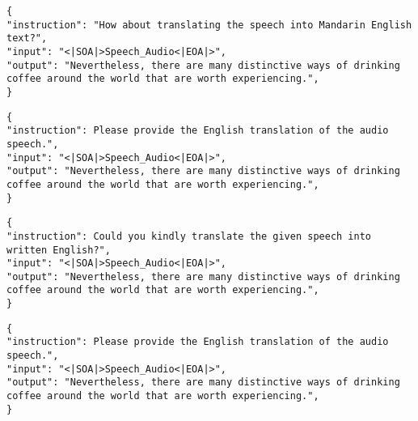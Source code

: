 \begin{tcolorbox}[colback=white, colframe=black, boxrule=0.2mm, arc=0mm, title=Speech-to-Text Translation Insutrction Variation Example 2]
\begin{lstlisting}[basicstyle=\ttfamily, breaklines=true]
{
"instruction": "How about translating the speech into Mandarin English text?", 
"input": "<|SOA|>Speech_Audio<|EOA|>", 
"output": "Nevertheless, there are many distinctive ways of drinking coffee around the world that are worth experiencing.", 
}
\end{lstlisting}
\end{tcolorbox}


\begin{tcolorbox}[colback=white, colframe=black, boxrule=0.2mm, arc=0mm, title=Speech-to-Text Translation Insutrction Variation Example 3]
\begin{lstlisting}[basicstyle=\ttfamily, breaklines=true]
{
"instruction": Please provide the English translation of the audio speech.", 
"input": "<|SOA|>Speech_Audio<|EOA|>", 
"output": "Nevertheless, there are many distinctive ways of drinking coffee around the world that are worth experiencing.", 
}
\end{lstlisting}
\end{tcolorbox}

\begin{tcolorbox}[colback=white, colframe=black, boxrule=0.2mm, arc=0mm, title=Speech-to-Text Translation Insutrction Variation Example 4]
\begin{lstlisting}[basicstyle=\ttfamily, breaklines=true]
{
"instruction": Could you kindly translate the given speech into written English?", 
"input": "<|SOA|>Speech_Audio<|EOA|>", 
"output": "Nevertheless, there are many distinctive ways of drinking coffee around the world that are worth experiencing.", 
}
\end{lstlisting}
\end{tcolorbox}



\begin{tcolorbox}[colback=white, colframe=black, boxrule=0.2mm, arc=0mm, title=Speech-to-Text Translation Insutrction Variation Example 5]
\begin{lstlisting}[basicstyle=\ttfamily, breaklines=true]
{
"instruction": Please provide the English translation of the audio speech.", 
"input": "<|SOA|>Speech_Audio<|EOA|>", 
"output": "Nevertheless, there are many distinctive ways of drinking coffee around the world that are worth experiencing.", 
}
\end{lstlisting}
\end{tcolorbox}



